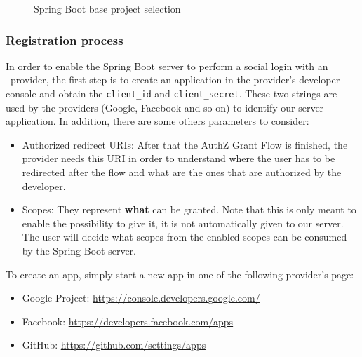 \begin{figure}[h!]
    \centering
    \caption{Spring Boot base project selection}
    \label{fig:spring}
\end{figure}

\subsubsection{Registration process}
In order to enable the Spring Boot server to perform a social login with an \oauth\ provider, the first step is to create an application in the provider's developer console and obtain the \texttt{client\_id} and \texttt{client\_secret}. These two strings are used by the providers (Google, Facebook and so on) to identify our server application. In addition, there are some others parameters to consider:

\begin{itemize}
    \item Authorized redirect URIs: After that the AuthZ Grant Flow is finished, the provider needs this URI in order to understand where the user has to be redirected after the flow and what are the ones that are authorized by the developer.
    \item Scopes: They represent \textbf{what} can be granted. Note that this is only meant to enable the possibility to give it, it is not automatically given to our server. The user will decide what scopes from the enabled scopes can be consumed by the Spring Boot server.
\end{itemize}

\noindent To create an app, simply start a new app in one of the following provider's page:

\begin{itemize}
    \item Google Project: \url{https://console.developers.google.com/}
    \item Facebook: \url{https://developers.facebook.com/apps}
    \item GitHub: \url{https://github.com/settings/apps}
\end{itemize}


